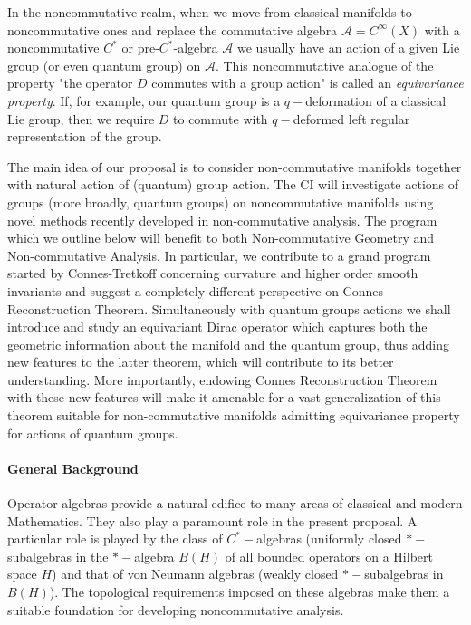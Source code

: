 \documentclass{article}
\begin{document}
In the noncommutative realm, when we move from classical manifolds to noncommutative ones and replace the commutative algebra $\mathcal{A}=C^{\infty}(X)$ with a noncommutative $C^*$ or pre-$C^*$-algebra $\mathcal{A}$ we usually have an action of a given Lie group (or even quantum group) on $\mathcal{A}.$ This noncommutative analogue of the property "the operator $D$ commutes with a group action" is called an {\it equivariance property}. If, for example, our quantum group is a $q-$deformation of a classical Lie group, then we require $D$ to commute with $q-$deformed left regular representation of the group.


The main idea of our proposal is to consider non-commutative manifolds together with natural action of (quantum) group action. The CI will investigate actions of groups (more broadly, quantum groups) on noncommutative manifolds using novel methods recently developed in non-commutative analysis. The program which we outline below will benefit to both Non-commutative Geometry and Non-commutative Analysis. In particular, we contribute to a grand program started by Connes-Tretkoff \cite{ConnesTretkoff} concerning curvature and higher order smooth invariants and suggest a completely different perspective on Connes Reconstruction Theorem. Simultaneously with quantum groups actions we shall introduce and study an equivariant Dirac operator which captures both the geometric information about the manifold and the quantum group, thus adding new features to the latter theorem, which will contribute to its better understanding. More importantly, endowing Connes Reconstruction Theorem with these new features will make it amenable for a vast generalization of this theorem suitable for non-commutative manifolds admitting equivariance property for actions of quantum groups.

\paragraph*{General Background}

Operator algebras provide a natural edifice to many areas of classical and modern Mathematics. They also play a paramount role in the present proposal. A particular role is played by the class of $C^{\ast}-$algebras (uniformly closed $\ast-$subalgebras in the $\ast-$algebra $B(H)$  of all bounded operators on a Hilbert space $H$) and that of von Neumann algebras (weakly closed $\ast-$subalgebras in $B(H)$). The topological requirements imposed on these algebras make them a suitable foundation for developing noncommutative analysis. 
\end{document}
